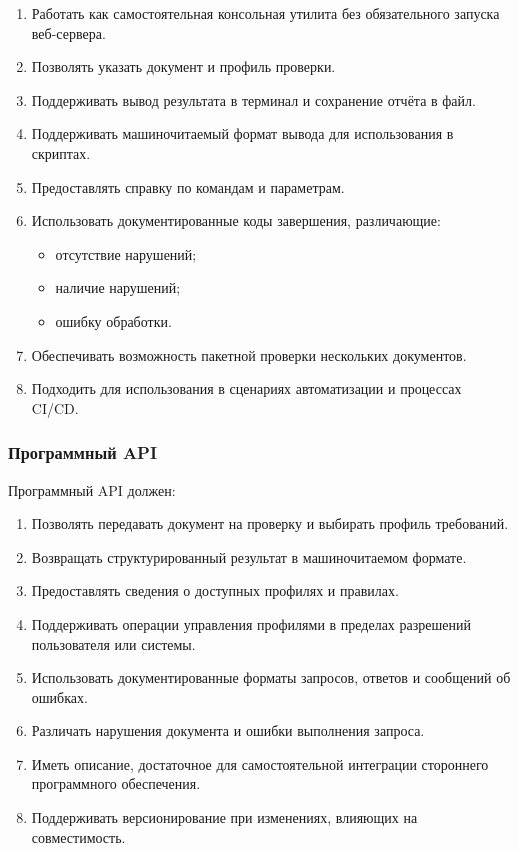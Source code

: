 \documentclass[a4paper,14pt]{extarticle}
\begin{document}
\begin{enumerate}
    \item Работать как самостоятельная консольная утилита без обязательного запуска веб-сервера.
    \item Позволять указать документ и профиль проверки.
    \item Поддерживать вывод результата в терминал и сохранение отчёта в файл.
    \item Поддерживать машиночитаемый формат вывода для использования в скриптах.
    \item Предоставлять справку по командам и параметрам.
    \item Использовать документированные коды завершения, различающие:
    \begin{itemize}
        \item отсутствие нарушений;
        \item наличие нарушений;
        \item ошибку обработки.
    \end{itemize}
    \item Обеспечивать возможность пакетной проверки нескольких документов.
    \item Подходить для использования в сценариях автоматизации и процессах CI/CD.
\end{enumerate}

\subsubsection{Программный API}

Программный API должен:

\begin{enumerate}
    \item Позволять передавать документ на проверку и выбирать профиль требований.
    \item Возвращать структурированный результат в машиночитаемом формате.
    \item Предоставлять сведения о доступных профилях и правилах.
    \item Поддерживать операции управления профилями в пределах разрешений пользователя или системы.
    \item Использовать документированные форматы запросов, ответов и сообщений об ошибках.
    \item Различать нарушения документа и ошибки выполнения запроса.
    \item Иметь описание, достаточное для самостоятельной интеграции стороннего программного обеспечения.
    \item Поддерживать версионирование при изменениях, влияющих на совместимость.
\end{enumerate}
\end{document}
